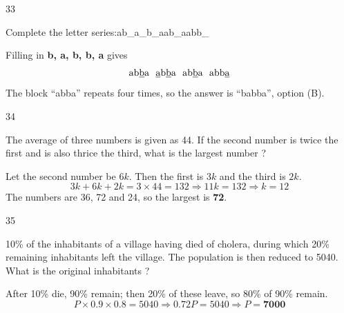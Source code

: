\begin{question}{33}
{Complete the letter series:\newline ab\_a\_b\_aab\_aabb\_\par}
\begin{explain}
Filling in \textbf{b, a, b, b, a} gives
\[\text{ab\underline{b}a}\ \ \text{\underline{a}b\underline{b}a}\ \ \text{ab\underline{b}a}\ \ \text{abb\underline{a}}\]
The block ``abba'' repeats four times, so the answer is ``babba'', option (B).
\end{explain}
\end{question}

\begin{question}{34}
{The average of three numbers is given as 44. If the second number is twice the first and is also thrice the third, what is the largest number ?\par}
\begin{explain}
Let the second number be $6k$. Then the first is $3k$ and the third is $2k$.
\[3k+6k+2k=3\times44=132\Rightarrow 11k=132\Rightarrow k=12\]
The numbers are 36, 72 and 24, so the largest is \textbf{72}.
\end{explain}
\end{question}

\begin{question}{35}
{10\% of the inhabitants of a village having died of cholera, during which 20\% remaining inhabitants left the village. The population is then reduced to 5040. What is the original inhabitants ?\par}
\begin{explain}
After 10\% die, 90\% remain; then 20\% of these leave, so 80\% of 90\% remain.
\[P\times0.9\times0.8=5040\Rightarrow 0.72P=5040\Rightarrow P=\mathbf{7000}\]
\end{explain}
\end{question}

